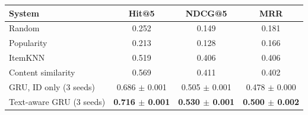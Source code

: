 \begin{tabular}{lccc}
\toprule
System & Hit@5 & NDCG@5 & MRR \\
\midrule
Random & 0.252 & 0.149 & 0.181 \\
Popularity & 0.213 & 0.128 & 0.166 \\
ItemKNN & 0.519 & 0.406 & 0.406 \\
Content similarity & 0.569 & 0.411 & 0.402 \\
GRU, ID only (3 seeds) & 0.686 $\pm$ 0.001 & 0.505 $\pm$ 0.001 & 0.478 $\pm$ 0.000 \\
Text-aware GRU (3 seeds) & \textbf{0.716 $\pm$ 0.001} & \textbf{0.530 $\pm$ 0.001} & \textbf{0.500 $\pm$ 0.002} \\
\bottomrule
\end{tabular}
